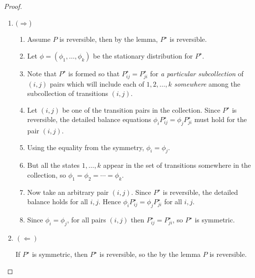 \documentclass[12pt]{article}
\begin{document}
\begin{proof}
    \begin{enumerate}
        \item
            \( (\Rightarrow \))
            \begin{enumerate}
                \item
                    Assume \( P \) is reversible, then by the lemma, \(
                    P^{\star} \) is reversible.
                \item
                    Let \( \phi = (\phi_1, \dots, \phi_k) \) be the
                    stationary distribution for \( P^{\star} \).
                \item
                    Note that \( P^{\star} \) is formed so that \( P_{ij}^
                    {\star} = P_{ji}^{\star} \) for \emph{a particular
                    subcollection} of \( (i,j) \) pairs which will
                    include each of \( 1, 2, \dots, k \) \emph{somewhere}
                    among the subcollection of transitions \( (i,j) \).
                \item
                    Let \( (i,j) \) be one of the transition pairs in
                    the collection. Since \( P^{\star} \) is reversible,
                    the detailed balance equations \( \phi_i P_{ij}^{\star}
                    = \phi_j P_{ji}^{\star} \) must hold for the pair \(
                    (i,j) \).
                \item
                    Using the equality from the symmetry, \( \phi_i =
                    \phi_j \).
                \item
                    But all the states \( 1, \dots, k \) appear in the
                    set of transitions somewhere in the collection, so \(
                    \phi_1 = \phi_2 = \cdots = \phi_k \).
                \item
                    Now take an arbitrary pair \( (i,j) \).  Since \( P^
                    {\star} \) is reversible, the detailed balance holds
                    for all \( i,j \).  Hence \( \phi_i P_{ij}^{\star} =
                    \phi_j P_{ji}^{\star} \) for all \( i,j \).
                \item
                    Since \( \phi_i = \phi_j \), for all pairs \( (i,j) \)
                    then \( P_{ij}^{\star} = P_{ji}^{\star} \), so \( P^
                    {\star} \) is symmetric.
            \end{enumerate}
        \item
            \( (\Leftarrow) \)

            If \( P^{\star} \) is symmetric, then \( P^{\star} \) is
            reversible, so the by the lemma \( P \) is reversible.
    \end{enumerate}
\end{proof}
\end{document}
